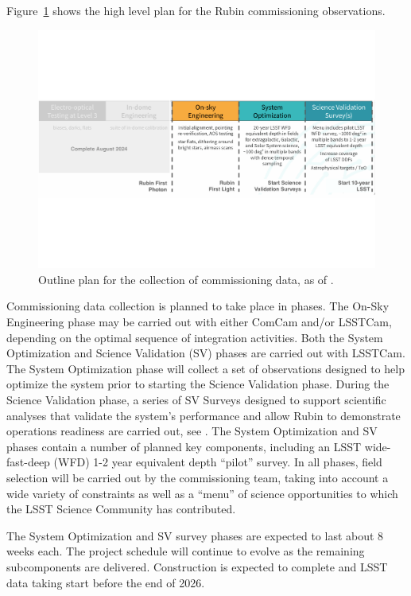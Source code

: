 Figure~\ref{fig:commissioning} shows the high level plan for the Rubin commissioning observations. 
\begin{figure}[htb]
\centering
\includegraphics[width=0.95\linewidth]{figures/commissioning-plan}
\caption{Outline plan for the collection of commissioning data, as of \currentdate.}
\label{fig:commissioning}
\end{figure}
Commissioning data collection is planned to take place in phases.
The On-Sky Engineering phase may be carried out with either ComCam and/or LSSTCam, depending on the optimal sequence of integration activities.
Both the System Optimization and Science Validation (SV) phases are carried out with LSSTCam. 
The System Optimization phase will collect a set of observations designed to help optimize the system prior to starting the Science Validation phase.
During the Science Validation phase, a series of SV Surveys designed to support scientific analyses that validate the system's performance and allow Rubin to demonstrate operations readiness are carried out, see .
The System Optimization and SV phases contain a number of planned key components, including an LSST wide-fast-deep (WFD) 1-2 year equivalent depth ``pilot'' survey.
In all phases, field selection will be carried out by the commissioning team, taking into account a wide variety of constraints as well as a ``menu'' of science opportunities to which the LSST Science Community has contributed.

The System Optimization and SV survey phases are expected to last about 8 weeks each.
The project schedule will continue to evolve as the remaining subcomponents are delivered. 
Construction is expected to complete and LSST data taking start before the end of 2026.

